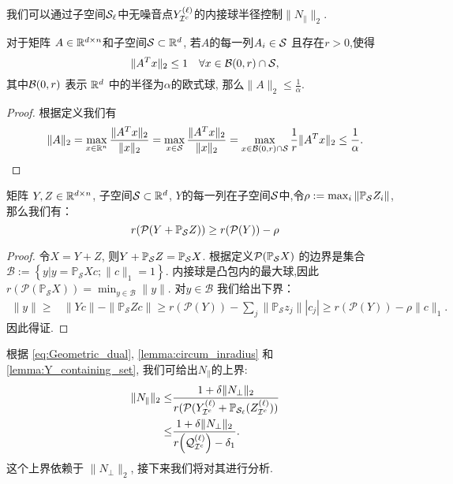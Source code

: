 我们可以通过子空间\(\mathcal{S}_\ell\)中无噪音点\(Y^{(\ell)}_{\mathcal{I}^c}\)的内接球半径控制\(\|N_{\parallel}\|_2\).
\begin{lemma}\label{lemma:circum_inradius}
  对于矩阵 \(A \in \mathbb{R}^{d \times n}\)和子空间\(\mathcal{S}\subset \mathbb{R}^d\), 
  若\(A\)的每一列\(A_i \in \mathcal{S}\) 且存在\(r>0\),使得
  \[\|A^Tx\|_2 \leq 1 \quad \forall x \in \mathcal{B}(0, r)\cap \mathcal{S},\]
  其中\(\mathcal{B}(0, r)\) 表示 \(\mathbb{R}^d\) 中的半径为\(\alpha\)的欧式球,
  那么\(\|A\|_2 \leq \frac{1}{\alpha}\).
\end{lemma}
\begin{proof}
  根据定义我们有
  \begin{align*}
    \|A\|_2 = \max_{x\in \mathbb{R}^n} \frac{\|A^Tx\|_2}{\|x\|_2}
    = \max_{x \in \mathcal{S}} \frac{\|A^Tx\|_2}{\|x\|_2}
    = \max_{x \in \mathcal{B}(0,r) \cap \mathcal{S}} \frac{1}{r} \|A^Tx\|_2
    \leq \frac{1}{\alpha}.
  \end{align*}
\end{proof}

\begin{lemma}\label{lemma:Y_containing_set}
  矩阵 \(Y, Z\in \mathbb{R}^{d \times n}\), 子空间\(\mathcal{S} \subset \mathbb{R}^d\),
  \(Y\)的每一列在子空间\(\mathcal{S}\)中,令\(\rho:=\max_{i}\|\mathbb{P}_{\mathcal{S}} Z_i\|\),
  那么我们有：
  \begin{equation*}
    r(\mathcal{P}(Y+\mathbb{P}_{\mathcal{S}} Z)) \geq r(\mathcal{P}(Y)) - \rho
  \end{equation*}
\end{lemma}
\begin{proof}
  令\(X=Y+Z\), 则\(Y+\mathbb{P}_{\mathcal{S}} Z=\mathbb{P}_{\mathcal{S}} X\). 根据定义\(\mathcal{P}(\mathbb{P}_{\mathcal{S}} X)\) 的边界是集合 \(\mathcal{B}:=
  \left\{y|y=\mathbb{P}_\mathcal{S} X c; \|c\|_1=1\right\}\).
  内接球是凸包内的最大球,因此 \(r(\mathcal{P}(\mathbb{P}_\mathcal{S} X)) =
  \min_{y\in \mathcal{B}} \|y\|\). 对\(y \in \mathcal{B} \) 我们给出下界：
  \begin{align*}
    \|y\| \geq& \|Yc\|-\|\mathbb{P}_\mathcal{S}Z c\|\geq r(\mathcal{P}(Y)) - {\sum}_j{\|\mathbb{P}_\mathcal{S}z_j}\||c_j|
    \geq r(\mathcal{P}(Y)) - \rho\|c\|_1.
  \end{align*}
  因此得证.
\end{proof}

根据 \eqref{eq:Geometric_dual}, \autoref{lemma:circum_inradius} 和\autoref{lemma:Y_containing_set},  
我们可给出\(N_{\parallel}\)的上界:
\begin{align}
  \|N_{\parallel}\|_2 \leq& \frac{1+\delta\|N_{\perp}\|_2}
  {r(\mathcal{P}(Y_{\mathcal{I}^c}^{(\ell)}+\mathbb{P}_{\mathcal{S}_{\ell}}(Z_{\mathcal{I}^c}^{(\ell)}))}
  \nonumber \\
  \leq& \frac{1+\delta\|N_{\perp}\|_2}{r{\left( \mathcal{Q}_{\mathcal{I}^c}^{(\ell)}\right)}-\delta_1}.\label{eq:nu1_bound}
\end{align}
这个上界依赖于 \(\|N_{\perp}\|_2\), 接下来我们将对其进行分析.

